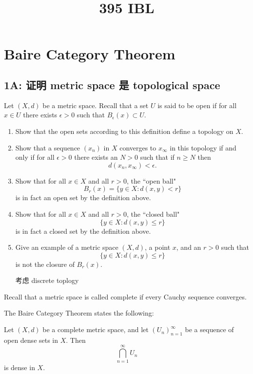 \documentclass[lang=cn,11pt]{template}
\title{395 IBL}
\begin{document}
\frontmatter
\tableofcontents
\mainmatter

\chapter{Baire Category Theorem}

\section*{1A: 证明 metric space 是 topological space}
 Let $(X,d)$ be a metric space. Recall that a set $U$ is said to be open if for all $x\in U$ there exists $\epsilon>0$ such that $B_\epsilon(x) \subset U$.
\begin{enumerate}
\item Show that the open sets according to this definition define a topology on $X$. 
\item Show that a sequence $(x_n)$ in $X$ converges to $x_\infty$ in  this topology if and only if for all $\epsilon>0$ there exists an $N>0$ such that if $n\geq N$ then 
$$d(x_n, x_\infty)<\epsilon.$$
\item Show that  for all $x\in X$ and all $r>0$, the ``open ball"
$$B_r(x) = \{ y \in X : d(x,y)<r\}$$
is in fact an open set by the definition above. 
\item Show that  for all $x\in X$ and all $r>0$, the ``closed ball"
$$ \{ y \in X : d(x,y)\leq r\}$$
is in fact a closed set by the definition above. 
\item Give an example of a metric space $(X,d)$, a point $x$, and an $r>0$ such that 
$$\{ y \in X : d(x,y)\leq r\}$$
is not the closure of $B_r(x)$.

\begin{solution}
    考虑 discrete toplogy
\end{solution}
\end{enumerate}

Recall that a metric space is called complete if every Cauchy sequence converges. 

The Baire Category Theorem states the following: 

\begin{theorem}
    Let $(X,d)$ be a complete metric space, and let $(U_n)_{n=1}^\infty$ be a sequence of open dense sets in $X$. Then 
$$\bigcap_{n=1}^\infty U_n$$
is dense in $X$. 
\end{theorem}
\end{document}
